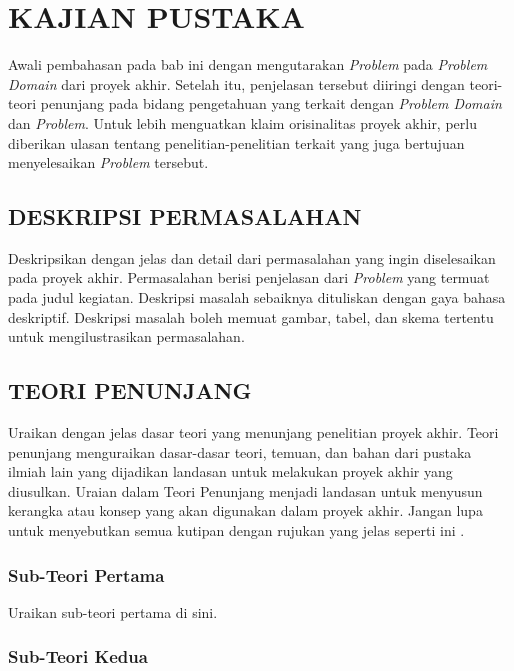 \chapter{KAJIAN PUSTAKA}

Awali pembahasan pada bab ini dengan mengutarakan \textit{Problem} pada
\textit{Problem Domain} dari proyek akhir. Setelah itu, penjelasan tersebut diiringi
dengan teori-teori penunjang pada bidang pengetahuan yang terkait dengan
\textit{Problem Domain} dan \textit{Problem}. Untuk lebih menguatkan klaim orisinalitas
proyek akhir, perlu diberikan ulasan tentang penelitian-penelitian terkait yang juga
bertujuan menyelesaikan \textit{Problem} tersebut.

\section{DESKRIPSI PERMASALAHAN}

Deskripsikan dengan jelas dan detail dari permasalahan yang ingin diselesaikan pada
proyek akhir. Permasalahan berisi penjelasan dari \textit{Problem} yang termuat pada
judul kegiatan. Deskripsi masalah sebaiknya dituliskan dengan gaya bahasa deskriptif.
Deskripsi masalah boleh memuat gambar, tabel, dan skema tertentu untuk mengilustrasikan
permasalahan.

\section{TEORI PENUNJANG}

Uraikan dengan jelas dasar teori yang menunjang penelitian proyek akhir. Teori penunjang
menguraikan dasar-dasar teori, temuan, dan bahan dari pustaka ilmiah lain yang dijadikan
landasan untuk melakukan proyek akhir yang diusulkan. Uraian dalam Teori Penunjang
menjadi landasan untuk menyusun kerangka atau konsep yang akan digunakan dalam proyek
akhir. Jangan lupa untuk menyebutkan semua kutipan dengan rujukan yang jelas seperti
ini \cite{contoh_buku}.

\subsection{Sub-Teori Pertama}

Uraikan sub-teori pertama di sini.

\subsection{Sub-Teori Kedua}

